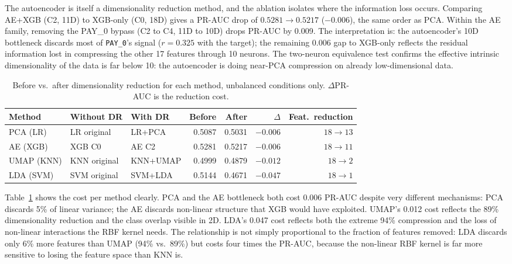 \documentclass[12pt,a4paper]{article}
\begin{document}
The autoencoder is itself a dimensionality reduction method, and the ablation
isolates where the information loss occurs. Comparing AE+XGB (C2, 11D) to
XGB-only (C0, 18D) gives a PR-AUC drop of $0.5281 \to 0.5217$ ($-0.006$),
the same order as PCA. Within the AE family, removing the PAY\_0 bypass
(C2 to C4, 11D to 10D) drops PR-AUC by 0.009. The interpretation is:
the autoencoder's 10D bottleneck discards most of \texttt{PAY\_0}'s signal
($r = 0.325$ with the target); the remaining 0.006 gap to XGB-only reflects
the residual information lost in compressing the other 17 features through 10
neurons. The two-neuron equivalence test confirms the effective intrinsic
dimensionality of the data is far below 10: the autoencoder is doing near-PCA
compression on already low-dimensional data.

\begin{table}[H]
\centering
\caption{Before vs.\ after dimensionality reduction for each method, unbalanced
         conditions only. $\Delta$PR-AUC is the reduction cost.}
\label{tab:dr_compare}
\small
\begin{tabular}{lllrrrr}
\toprule
Method & Without DR & With DR & Before & After & $\Delta$ & Feat.\ reduction \\
\midrule
PCA (LR)   & LR original & LR+PCA & 0.5087 & 0.5031 & $-0.006$ & $18 \to 13$ \\
AE (XGB)   & XGB C0      & AE C2  & 0.5281 & 0.5217 & $-0.006$ & $18 \to 11$ \\
UMAP (KNN) & KNN original & KNN+UMAP & 0.4999 & 0.4879 & $-0.012$ & $18 \to 2$ \\
LDA (SVM)  & SVM original & SVM+LDA  & 0.5144 & 0.4671 & $-0.047$ & $18 \to 1$ \\
\bottomrule
\end{tabular}
\end{table}

Table~\ref{tab:dr_compare} shows the cost per method clearly. PCA and the
AE bottleneck both cost 0.006 PR-AUC despite very different mechanisms: PCA
discards 5\% of linear variance; the AE discards non-linear structure that XGB
would have exploited. UMAP's 0.012 cost reflects the 89\% dimensionality
reduction and the class overlap visible in 2D. LDA's 0.047 cost reflects both
the extreme 94\% compression and the loss of non-linear interactions the RBF
kernel needs. The relationship is not simply proportional to the fraction of
features removed: LDA discards only 6\% more features than UMAP (94\% vs.\ 89\%)
but costs four times the PR-AUC, because the non-linear RBF kernel is far more
sensitive to losing the feature space than KNN is.
\end{document}
